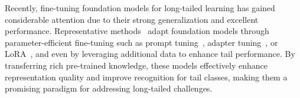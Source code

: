 

Recently, fine-tuning foundation models for long-tailed learning has gained considerable attention due to their strong generalization and excellent performance. Representative methods~\cite{ shi2024long, tian2022vl, long2022retrieval,li2024improving,xia2024lmpt} adapt foundation models through parameter-efficient fine-tuning such as prompt tuning~\cite{jia2022visual, dong2023lpt}, adapter tuning~\cite{jia2021scaling, steitz2024adapters}, or LoRA~\cite{hu2022lora}, and even by leveraging additional data to enhance tail performance. By transferring rich pre-trained knowledge, these models effectively enhance representation quality and improve recognition for tail classes, making them a promising paradigm for addressing long-tailed challenges.


